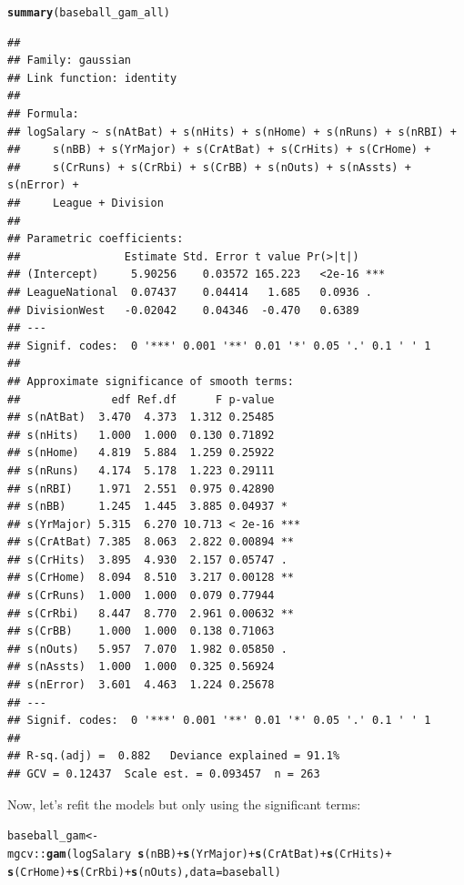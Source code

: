 \documentclass{article}\usepackage[]{graphicx}\usepackage[]{color}
\makeatletter
\newcommand{\hlopt}[1]{\textcolor[rgb]{0,0,0}{#1}}%
\newcommand{\hlstd}[1]{\textcolor[rgb]{0.345,0.345,0.345}{#1}}%
\newcommand{\hlkwb}[1]{\textcolor[rgb]{0.69,0.353,0.396}{#1}}%
\newcommand{\hlkwc}[1]{\textcolor[rgb]{0.333,0.667,0.333}{#1}}%
\newcommand{\hlkwd}[1]{\textcolor[rgb]{0.737,0.353,0.396}{\textbf{#1}}}%
\newenvironment{kframe}{%
 \def\at@end@of@kframe{}%
 \ifinner\ifhmode%
  \def\at@end@of@kframe{\end{minipage}}%
  \begin{minipage}{\columnwidth}%
 \fi\fi%
 \def\FrameCommand##1{\hskip\@totalleftmargin \hskip-\fboxsep
 \colorbox{shadecolor}{##1}\hskip-\fboxsep
     \hskip-\linewidth \hskip-\@totalleftmargin \hskip\columnwidth}%
 \MakeFramed {\advance\hsize-\width
   \@totalleftmargin\z@ \linewidth\hsize
   \@setminipage}}%
 {\par\unskip\endMakeFramed%
 \at@end@of@kframe}
\newenvironment{knitrout}{}{} %
\makeatother
\begin{document}
\begin{knitrout}
\begin{kframe}
\begin{alltt}
\hlkwd{summary}\hlstd{(baseball_gam_all)}
\end{alltt}
\begin{verbatim}
## 
## Family: gaussian 
## Link function: identity 
## 
## Formula:
## logSalary ~ s(nAtBat) + s(nHits) + s(nHome) + s(nRuns) + s(nRBI) + 
##     s(nBB) + s(YrMajor) + s(CrAtBat) + s(CrHits) + s(CrHome) + 
##     s(CrRuns) + s(CrRbi) + s(CrBB) + s(nOuts) + s(nAssts) + s(nError) + 
##     League + Division
## 
## Parametric coefficients:
##                Estimate Std. Error t value Pr(>|t|)    
## (Intercept)     5.90256    0.03572 165.223   <2e-16 ***
## LeagueNational  0.07437    0.04414   1.685   0.0936 .  
## DivisionWest   -0.02042    0.04346  -0.470   0.6389    
## ---
## Signif. codes:  0 '***' 0.001 '**' 0.01 '*' 0.05 '.' 0.1 ' ' 1
## 
## Approximate significance of smooth terms:
##              edf Ref.df      F p-value    
## s(nAtBat)  3.470  4.373  1.312 0.25485    
## s(nHits)   1.000  1.000  0.130 0.71892    
## s(nHome)   4.819  5.884  1.259 0.25922    
## s(nRuns)   4.174  5.178  1.223 0.29111    
## s(nRBI)    1.971  2.551  0.975 0.42890    
## s(nBB)     1.245  1.445  3.885 0.04937 *  
## s(YrMajor) 5.315  6.270 10.713 < 2e-16 ***
## s(CrAtBat) 7.385  8.063  2.822 0.00894 ** 
## s(CrHits)  3.895  4.930  2.157 0.05747 .  
## s(CrHome)  8.094  8.510  3.217 0.00128 ** 
## s(CrRuns)  1.000  1.000  0.079 0.77944    
## s(CrRbi)   8.447  8.770  2.961 0.00632 ** 
## s(CrBB)    1.000  1.000  0.138 0.71063    
## s(nOuts)   5.957  7.070  1.982 0.05850 .  
## s(nAssts)  1.000  1.000  0.325 0.56924    
## s(nError)  3.601  4.463  1.224 0.25678    
## ---
## Signif. codes:  0 '***' 0.001 '**' 0.01 '*' 0.05 '.' 0.1 ' ' 1
## 
## R-sq.(adj) =  0.882   Deviance explained = 91.1%
## GCV = 0.12437  Scale est. = 0.093457  n = 263
\end{verbatim}
\end{kframe}
\end{knitrout}

Now, let's refit the models but only using the significant terms:

\begin{knitrout}
\color{fgcolor}\begin{kframe}
\begin{alltt}
\hlstd{baseball_gam} \hlkwb{<-} \hlstd{mgcv}\hlopt{::}\hlkwd{gam}\hlstd{(logSalary} \hlopt{~} \hlkwd{s}\hlstd{(nBB)} \hlopt{+} \hlkwd{s}\hlstd{(YrMajor)} \hlopt{+} \hlkwd{s}\hlstd{(CrAtBat)} \hlopt{+} \hlkwd{s}\hlstd{(CrHits)} \hlopt{+}
                           \hlkwd{s}\hlstd{(CrHome)} \hlopt{+} \hlkwd{s}\hlstd{(CrRbi)} \hlopt{+} \hlkwd{s}\hlstd{(nOuts),} \hlkwc{data} \hlstd{= baseball)}
\end{alltt}
\end{kframe}
\end{knitrout}
\end{document}
